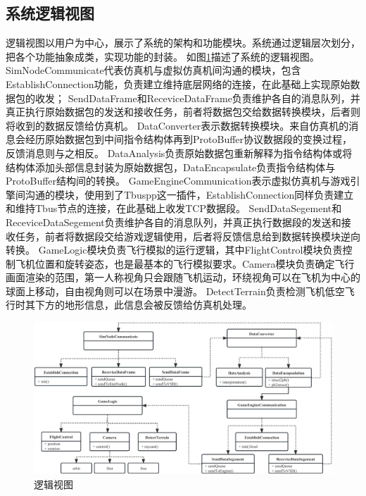 \subsection{系统逻辑视图}
逻辑视图以用户为中心，展示了系统的架构和功能模块。系统通过逻辑层次划分，把各个功能抽象成类，实现功能的封装。
如图\ref{logic}描述了系统的逻辑视图。SimNodeCommunicate代表仿真机与虚拟仿真机间沟通的模块，包含EstablishConnection功能，负责建立维持底层网络的连接，在此基础上实现原始数据包的收发；
SendDataFrame和ReceviceDataFrame负责维护各自的消息队列，并真正执行原始数据包的发送和接收任务，前者将数据包交给数据转换模块，后者则将收到的数据反馈给仿真机。
DataConverter表示数据转换模块。来自仿真机的消息会经历原始数据包到中间指令结构体再到ProtoBuffer协议数据段的变换过程，反馈消息则与之相反。
DataAnalysis负责原始数据包重新解释为指令结构体或将结构体添加头部信息封装为原始数据包，DataEncapsulate负责指令结构体与ProtoBuffer结构间的转换。
GameEngineCommunication表示虚拟仿真机与游戏引擎间沟通的模块，使用到了Tbuspp这一插件，EstablishConnection同样负责建立和维持Tbus节点的连接，在此基础上收发TCP数据段。
SendDataSegement和ReceviceDataSegement负责维护各自的消息队列，并真正执行数据段的发送和接收任务，前者将数据段交给游戏逻辑使用，后者将反馈信息给到数据转换模块逆向转换。
GameLogic模块负责飞行模拟的运行逻辑，其中FlightControl模块负责控制飞机位置和旋转姿态，也是最基本的飞行模拟要求。Camera模块负责确定飞行画面渲染的范围，第一人称视角只会跟随飞机运动，环绕视角可以在飞机为中心的球面上移动，自由视角则可以在场景中漫游。
DetectTerrain负责检测飞机低空飞行时其下方的地形信息，此信息会被反馈给仿真机处理。
\begin{figure}[h]
    \begin{center}
        \includegraphics[width=\textwidth]{pictures/logic.pdf}
        \caption{逻辑视图}
        \label{logic}
    \end{center}
\end{figure}
